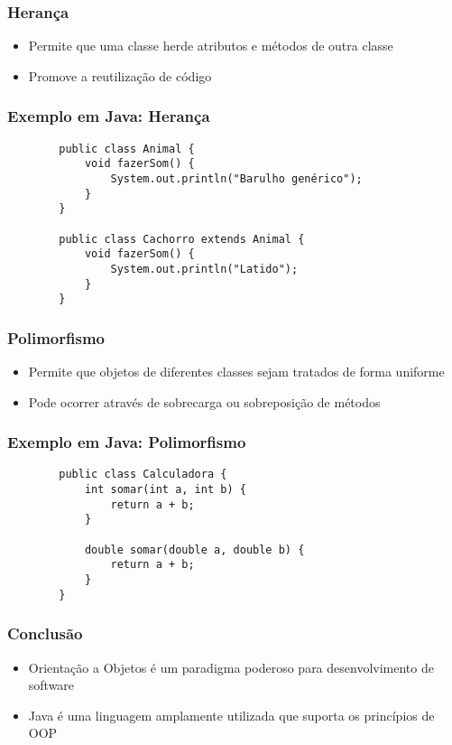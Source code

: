 \begin{frame}
	\frametitle{Herança}
	\begin{itemize}
		\item Permite que uma classe herde atributos e métodos de outra classe
		\item Promove a reutilização de código
	\end{itemize}
\end{frame}

\begin{frame}[fragile]
	\frametitle{Exemplo em Java: Herança}
	\begin{verbatim}
		public class Animal {
			void fazerSom() {
				System.out.println("Barulho genérico");
			}
		}
		
		public class Cachorro extends Animal {
			void fazerSom() {
				System.out.println("Latido");
			}
		}
	\end{verbatim}
\end{frame}

\begin{frame}
	\frametitle{Polimorfismo}
	\begin{itemize}
		\item Permite que objetos de diferentes classes sejam tratados de forma uniforme
		\item Pode ocorrer através de sobrecarga ou sobreposição de métodos
	\end{itemize}
\end{frame}

\begin{frame}[fragile]
	\frametitle{Exemplo em Java: Polimorfismo}
	\begin{verbatim}
		public class Calculadora {
			int somar(int a, int b) {
				return a + b;
			}
			
			double somar(double a, double b) {
				return a + b;
			}
		}
	\end{verbatim}
\end{frame}

\begin{frame}
	\frametitle{Conclusão}
	\begin{itemize}
		\item Orientação a Objetos é um paradigma poderoso para desenvolvimento de software
		\item Java é uma linguagem amplamente utilizada que suporta os princípios de OOP
	\end{itemize}
\end{frame}